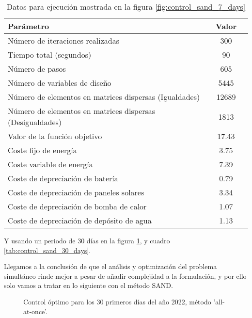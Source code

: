 \begin{table}[ht]
	\centering
	\caption{Datos para ejecución mostrada en la figura \ref{fig:control_sand_7_days}}
	\label{tab:control_sand_7_days}
	\begin{tabular}{@{}lcc@{}}
		\toprule
		Parámetro                                                 & Valor \\
		\midrule
		Número de iteraciones realizadas                          & 300   \\
		Tiempo total (segundos)                                   & 90    \\
		Número de pasos                                           & 605   \\
		Número de variables de diseño                             & 5445  \\
		Número de elementos en matrices dispersas (Igualdades)    & 12689 \\
		Número de elementos en matrices dispersas (Desigualdades) & 1813  \\
		\midrule
		Valor de la función objetivo                              & 17.43 \\
		\midrule
		Coste fijo de energía                                     & 3.75  \\
		Coste variable de energía                                 & 7.39  \\
		Coste de depreciación de batería                          & 0.79  \\
		Coste de depreciación de paneles solares                  & 3.34  \\
		Coste de depreciación de bomba de calor                   & 1.07  \\
		Coste de depreciación de depósito de agua                 & 1.13  \\
		\bottomrule
	\end{tabular}
\end{table}

Y usando un periodo de 30 días en la figura \ref{fig:control_sand_30_days}, y
cuadro \ref{tab:control_sand_30_days}.

Llegamos a la conclusión de que el análisis y optimización del problema
simultáneo rinde mejor a pesar de añadir complejidad a la formulación, y por
ello solo vamos a tratar en lo siguiente con el método SAND.

\begin{figure}[h] \centering
	\centering
	
	\caption{Control óptimo para los 30 primeros días del año 2022, método 'all-at-once'.}
	\label{fig:control_sand_30_days}
\end{figure}

